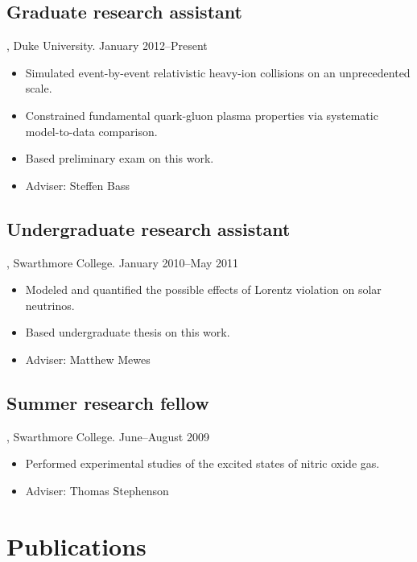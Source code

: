 \documentclass[letterpaper,10pt]{article}
\begin{document}
\subsection{Graduate research assistant}, Duke University. \hfill January 2012--Present

\begin{itemize}
  \item Simulated event-by-event relativistic heavy-ion collisions on an unprecedented scale.
  \item Constrained fundamental quark-gluon plasma properties via systematic model-to-data comparison.
  \item Based preliminary exam on this work.
  \item Adviser:  Steffen Bass
\end{itemize}


\subsection{Undergraduate research assistant}, Swarthmore College. \hfill January 2010--May 2011

\begin{itemize}
  \item Modeled and quantified the possible effects of Lorentz violation on solar neutrinos.
  \item Based undergraduate thesis on this work.
  \item Adviser:  Matthew Mewes
\end{itemize}



\subsection{Summer research fellow}, Swarthmore College. \hfill June--August 2009

\begin{itemize}
  \item Performed experimental studies of the excited states of nitric oxide gas.
  \item Adviser:  Thomas Stephenson
\end{itemize}



\pagebreak



\section{Publications}
\end{document}

